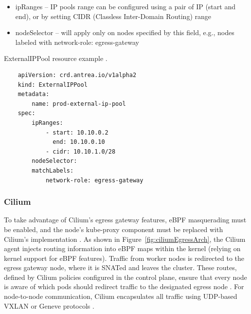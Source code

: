 \begin{itemize}
    \item ipRanges -- IP pools range can be configured using a pair of IP (start and end), or by setting CIDR (Classless Inter-Domain Routing) range
    \item nodeSelector -- will apply only on nodes specified by this field, e.g., nodes labeled with network-role: egress-gateway
\end{itemize}

\begin{listing}[htb]
    \centering
    \caption{ExternalIPPool resource example \cite{AntreaEgressArch}.}
    \begin{verbatim}
    apiVersion: crd.antrea.io/v1alpha2
    kind: ExternalIPPool
    metadata:
        name: prod-external-ip-pool
    spec:
        ipRanges:
            - start: 10.10.0.2
              end: 10.10.0.10
            - cidr: 10.10.1.0/28
        nodeSelector:
        matchLabels:
            network-role: egress-gateway
    \end{verbatim}
    \label{lst:yamlAntreaExternalIPPool}
\end{listing}
  


\subsubsection{Cilium}
\label{subsection:ciliumEgress}

To take advantage of Cilium's egress gateway features, eBPF masquerading must be enabled, and the node's kube-proxy component must be replaced with Cilium's implementation \cite{CiliumEgressGateway}. As shown in Figure~\ref{fig:ciliumEgressArch}, the Cilium agent injects routing information into eBPF maps within the kernel (relying on kernel support for eBPF features). Traffic from worker nodes is redirected to the egress gateway node, where it is SNATed and leaves the cluster. These routes, defined by Cilium policies configured in the control plane, ensure that every node is aware of which pods should redirect traffic to the designated egress node \cite{CiliumEgressGateway}. For node-to-node communication, Cilium encapsulates all traffic using UDP-based VXLAN or Geneve protocols \cite{CiliumRouting}.


